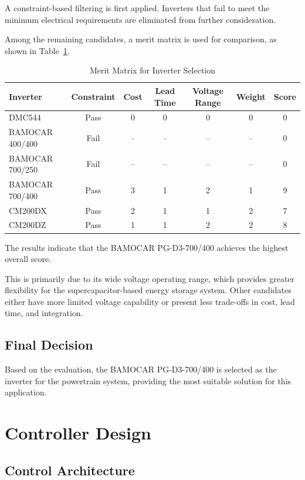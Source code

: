 A constraint-based filtering is first applied. Inverters that fail to meet the minimum electrical requirements are eliminated from further consideration.

Among the remaining candidates, a merit matrix is used for comparison, as shown in Table~\ref{tab:inverter_selection}.

\begin{table}[H]
\centering
\caption{Merit Matrix for Inverter Selection}
\label{tab:inverter_selection}
\begin{tabular}{lcccccc}
\toprule
Inverter & Constraint & Cost & Lead Time & Voltage Range & Weight & Score \\
\midrule
DMC544 & Pass & 0 & 0 & 0 & 0 & 0 \\
BAMOCAR 400/400 & Fail & -- & -- & -- & -- & 0 \\
BAMOCAR 700/250 & Fail & -- & -- & -- & -- & 0 \\
BAMOCAR 700/400 & Pass & 3 & 1 & 2 & 1 & 9 \\
CM200DX & Pass & 2 & 1 & 1 & 2 & 7 \\
CM200DZ & Pass & 1 & 1 & 2 & 2 & 8 \\
\bottomrule
\end{tabular}
\end{table}

The results indicate that the BAMOCAR PG-D3-700/400 achieves the highest overall score.

This is primarily due to its wide voltage operating range, which provides greater flexibility for the supercapacitor-based energy storage system. Other candidates either have more limited voltage capability or present less trade-offs in cost, lead time, and integration.

\subsection{Final Decision}

Based on the evaluation, the BAMOCAR PG-D3-700/400 is selected as the inverter for the powertrain system, providing the most suitable solution for this application.

\section{Controller Design}

\subsection{Control Architecture}

